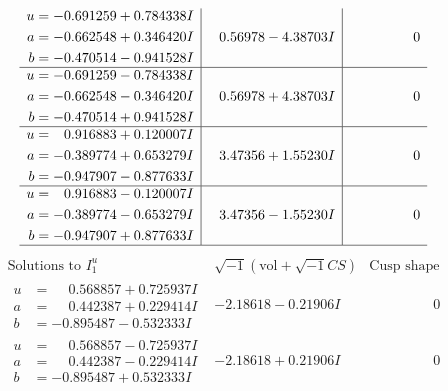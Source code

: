 \documentclass[1p]{elsarticle_modified}
\theoremstyle{definition}
\newcommand{\I}{\sqrt{-1}}
\begin{document}
$$\begin{array}{c|c|c}
\begin{aligned}
u &= -0.691259 + 0.784338 I \\
a &= -0.662548 + 0.346420 I \\
b &= -0.470514 - 0.941528 I\end{aligned}
 & \phantom{-}0.56978 - 4.38703 I & \phantom{-0.000000 } 0 \\ \hline\begin{aligned}
u &= -0.691259 - 0.784338 I \\
a &= -0.662548 - 0.346420 I \\
b &= -0.470514 + 0.941528 I\end{aligned}
 & \phantom{-}0.56978 + 4.38703 I & \phantom{-0.000000 } 0 \\ \hline\begin{aligned}
u &= \phantom{-}0.916883 + 0.120007 I \\
a &= -0.389774 + 0.653279 I \\
b &= -0.947907 - 0.877633 I\end{aligned}
 & \phantom{-}3.47356 + 1.55230 I & \phantom{-0.000000 } 0 \\ \hline\begin{aligned}
u &= \phantom{-}0.916883 - 0.120007 I \\
a &= -0.389774 - 0.653279 I \\
b &= -0.947907 + 0.877633 I\end{aligned}
 & \phantom{-}3.47356 - 1.55230 I & \phantom{-0.000000 } 0\\
 \hline 
 \end{array}$$\newpage$$\begin{array}{c|c|c}  
\text{Solutions to }I^u_{1}& \I (\text{vol} + \sqrt{-1}CS) & \text{Cusp shape}\\
 \hline 
\begin{aligned}
u &= \phantom{-}0.568857 + 0.725937 I \\
a &= \phantom{-}0.442387 + 0.229414 I \\
b &= -0.895487 - 0.532333 I\end{aligned}
 & -2.18618 - 0.21906 I & \phantom{-0.000000 } 0 \\ \hline\begin{aligned}
u &= \phantom{-}0.568857 - 0.725937 I \\
a &= \phantom{-}0.442387 - 0.229414 I \\
b &= -0.895487 + 0.532333 I\end{aligned}
 & -2.18618 + 0.21906 I & \phantom{-0.000000 } 0 \\ \hline\begin{aligned}

\end{aligned}
\end{array}$$
\end{document}

